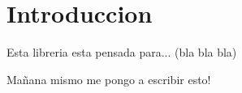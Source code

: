 \hypertarget{index_intro}{}\section{Introduccion}\label{index_intro}
Esta libreria esta pensada para... (bla bla bla)

Mañana mismo me pongo a escribir esto! 